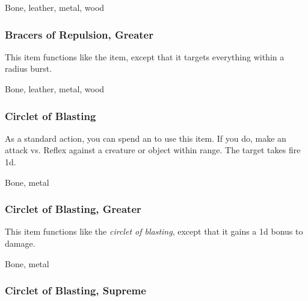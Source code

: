  


 Bone, leather, metal, wood


\lowercase{\hypertarget{item:Bracers of Repulsion, Greater}{}}\label{item:Bracers of Repulsion, Greater}
\hypertarget{item:Bracers of Repulsion, Greater}{\subsubsection{Bracers of Repulsion, Greater\hfill{}}}

This item functions like the  item, except that it targets everything within a \arealarge radius burst.



 


 Bone, leather, metal, wood


\lowercase{\hypertarget{item:Circlet of Blasting}{}}\label{item:Circlet of Blasting}
\hypertarget{item:Circlet of Blasting}{\subsubsection{Circlet of Blasting\hfill{}}}

As a standard action, you can spend an  to use this item.
If you do, make an attack vs. Reflex against a creature or object within \rngmed range.
\hit The target takes fire  \plus1d.



 


 Bone, metal


\lowercase{\hypertarget{item:Circlet of Blasting, Greater}{}}\label{item:Circlet of Blasting, Greater}
\hypertarget{item:Circlet of Blasting, Greater}{\subsubsection{Circlet of Blasting, Greater\hfill{}}}

This item functions like the \textit{circlet of blasting}, except that it gains a \plus1d bonus to damage.



 


 Bone, metal


\lowercase{\hypertarget{item:Circlet of Blasting, Supreme}{}}\label{item:Circlet of Blasting, Supreme}
\hypertarget{item:Circlet of Blasting, Supreme}{\subsubsection{Circlet of Blasting, Supreme\hfill{}}}

